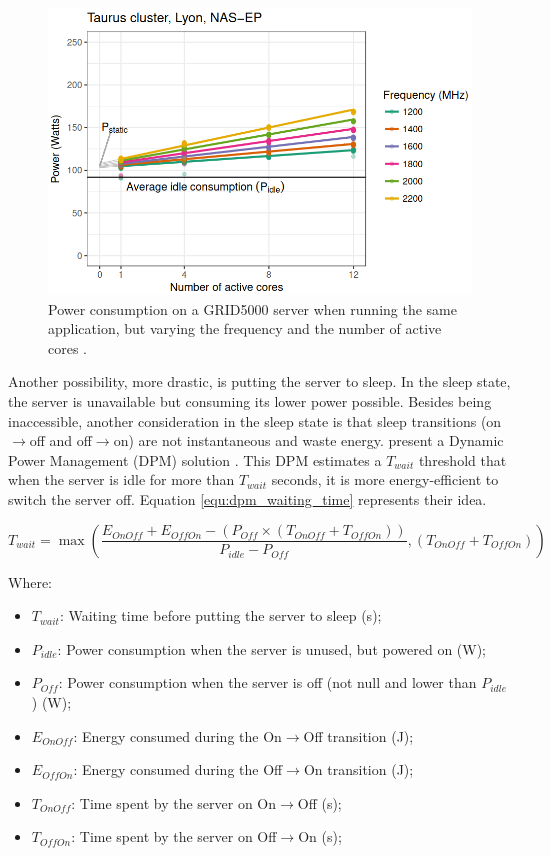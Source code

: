 \begin{figure}[!htb]
    \centering
    \includegraphics[scale=0.4]{Images/Related_works/cpu_usage.png}
    \caption{Power consumption on a GRID5000 server when running the same application, but varying the frequency and the number of active cores \cite{heinrich2017predicting}.}
    \label{fig:cpu_frequency_consumption}
\end{figure}

Another possibility, more drastic, is putting the server to sleep. In the sleep state, the server is unavailable but consuming its lower power possible. Besides being inaccessible, another consideration in the sleep state is that sleep transitions (on$\rightarrow$off and off$\rightarrow$on) are not instantaneous and waste energy. \citeauthor{rais2018quantifying} present a Dynamic Power Management (DPM) solution \cite{rais2018quantifying}. This DPM estimates a $T_{wait}$ threshold that when the server is idle for more than $T_{wait}$ seconds, it is more energy-efficient to switch the server off. Equation \ref{equ:dpm_waiting_time} represents their idea.

\begin{equation}
    \label{equ:dpm_waiting_time}
    T_{wait} = \max(\frac{E_{OnOff} + E_{OffOn} - (P_{Off} \times (T_{OnOff} + T_{OffOn}))}{P_{idle} - P_{Off}}, (T_{OnOff} + T_{OffOn}))
\end{equation}

Where:
\begin{itemize}
    \item $T_{wait}$: Waiting time before putting the server to sleep (s);
    \item $P_{idle}$: Power consumption when the server is unused, but powered on (W);
    \item $P_{Off}$: Power consumption when the server is off (not null and lower than $P_{idle}$) (W);
    \item $E_{OnOff}$: Energy consumed during the On$\rightarrow$Off transition (J);
    \item $E_{OffOn}$: Energy consumed during the Off$\rightarrow$On transition (J);
    \item $T_{OnOff}$: Time spent by the server on On$\rightarrow$Off (s);
    \item $T_{OffOn}$: Time spent by the server on Off$\rightarrow$On (s);
\end{itemize}


